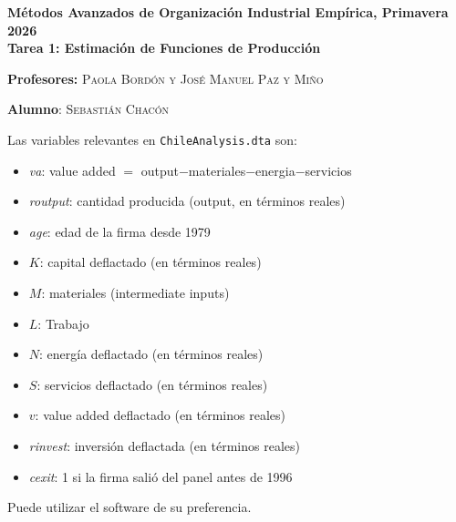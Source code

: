 \documentclass[answers]{exam}
\begin{document}
\begin{center}

\textbf{\large{Métodos Avanzados de Organización Industrial Empírica, Primavera 2026}} \\ \textbf{\large{Tarea 1: Estimación de Funciones de Producción}}

\medskip

\textbf{Profesores:} \textsc{Paola Bordón y José Manuel Paz y Miño}

\textbf{Alumno}: \textsc{Sebastián Chacón}

\end{center}
\vspace{7mm}

Las variables relevantes en \texttt{ChileAnalysis.dta} son:

\begin{itemize}
    \item \textit{va}: value added $=$ output$-$materiales$-$energia$-$servicios
    \item \textit{routput}: cantidad producida (output, en términos reales)
    \item \textit{age}: edad de la firma desde 1979
    \item $K$: capital deflactado (en términos reales)
    \item $M$: materiales (intermediate inputs)
    \item $L$: Trabajo
    \item $N$: energía deflactado (en términos reales)
    \item $S$: servicios deflactado (en términos reales)
    \item $v$: value added deflactado (en términos reales)
    \item \textit{rinvest}: inversión deflactada (en términos reales)
    \item \textit{cexit}: 1 si la firma salió del panel antes de 1996
\end{itemize}

Puede utilizar el software de su preferencia.
\end{document}
